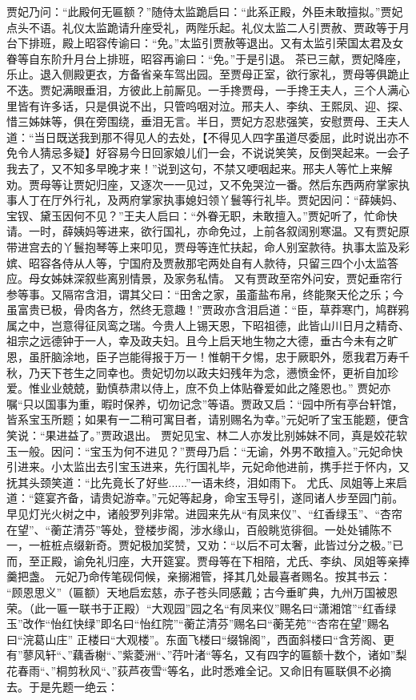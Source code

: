 \documentclass[12pt,oneside]{book}
\begin{document}
贾妃乃问：“此殿何无匾额？”随侍太监跪启曰：“此系正殿，外臣未敢擅拟。”贾妃点头不语。礼仪太监跪请升座受礼，两陛乐起。礼仪太监二人引贾赦、贾政等于月台下排班，殿上昭容传谕曰：“免。”太监引贾赦等退出。又有太监引荣国太君及女眷等自东阶升月台上排班，昭容再谕曰：“免。”于是引退。
茶已三献，贾妃降座，乐止。退入侧殿更衣，方备省亲车驾出园。至贾母正室，欲行家礼，贾母等俱跪止不迭。贾妃满眼垂泪，方彼此上前厮见。一手搀贾母，一手搀王夫人，三个人满心里皆有许多话，只是俱说不出，只管呜咽对泣。邢夫人、李纨、王熙凤、迎、探、惜三姊妹等，俱在旁围绕，垂泪无言。半日，贾妃方忍悲强笑，安慰贾母、王夫人道：“当日既送我到那不得见人的去处，【不得见人四字虽道尽委屈，此时说出亦不免令人猜忌多疑】好容易今日回家娘儿们一会，不说说笑笑，反倒哭起来。一会子我去了，又不知多早晚才来！”说到这句，不禁又哽咽起来。邢夫人等忙上来解劝。贾母等让贾妃归座，又逐次一一见过，又不免哭泣一番。然后东西两府掌家执事人丁在厅外行礼，及两府掌家执事媳妇领丫鬟等行礼毕。贾妃因问：“薛姨妈、宝钗、黛玉因何不见？”王夫人启曰：“外眷无职，未敢擅入。”贾妃听了，忙命快请。一时，薛姨妈等进来，欲行国礼，亦命免过，上前各叙阔别寒温。又有贾妃原带进宫去的丫鬟抱琴等上来叩见，贾母等连忙扶起，命人别室款待。执事太监及彩嫔、昭容各侍从人等，宁国府及贾赦那宅两处自有人款待，只留三四个小太监答应。母女姊妹深叙些离别情景，及家务私情。
又有贾政至帘外问安，贾妃垂帘行参等事。又隔帘含泪，谓其父曰：“田舍之家，虽齑盐布帛，终能聚天伦之乐；今虽富贵已极，骨肉各方，然终无意趣！”贾政亦含泪启道：“臣，草莽寒门，鸠群鸦属之中，岂意得征凤鸾之瑞。今贵人上锡天恩，下昭祖德，此皆山川日月之精奇、祖宗之远德钟于一人，幸及政夫妇。且今上启天地生物之大德，垂古今未有之旷恩，虽肝脑涂地，臣子岂能得报于万一！惟朝干夕惕，忠于厥职外，愿我君万寿千秋，乃天下苍生之同幸也。贵妃切勿以政夫妇残年为念，懑愤金怀，更祈自加珍爱。惟业业兢兢，勤慎恭肃以侍上，庶不负上体贴眷爱如此之隆恩也。”
贾妃亦嘱“只以国事为重，暇时保养，切勿记念”等语。贾政又启：“园中所有亭台轩馆，皆系宝玉所题；如果有一二稍可寓目者，请别赐名为幸。”元妃听了宝玉能题，便含笑说：“果进益了。”贾政退出。
贾妃见宝、林二人亦发比别姊妹不同，真是姣花软玉一般。因问：“宝玉为何不进见？”贾母乃启：“无谕，外男不敢擅入。”元妃命快引进来。小太监出去引宝玉进来，先行国礼毕，元妃命他进前，携手拦于怀内，又抚其头颈笑道：“比先竟长了好些......”一语未终，泪如雨下。
尤氏、凤姐等上来启道：“筵宴齐备，请贵妃游幸。”元妃等起身，命宝玉导引，遂同诸人步至园门前。早见灯光火树之中，诸般罗列非常。进园来先从“有凤来仪”、“红香绿玉”、“杏帘在望”、“蘅芷清芬”等处，登楼步阁，涉水缘山，百般眺览徘徊。一处处铺陈不一，一桩桩点缀新奇。贾妃极加奖赞，又劝：“以后不可太奢，此皆过分之极。”已而，至正殿，谕免礼归座，大开筵宴。贾母等在下相陪，尤氏、李纨、凤姐等亲捧羹把盏。
元妃乃命传笔砚伺候，亲搦湘管，择其几处最喜者赐名。按其书云：
“顾恩思义”（匾额）天地启宏慈，赤子苍头同感戴；古今垂旷典，九州万国被恩荣。（此一匾一联书于正殿）“大观园”园之名“有凤来仪”赐名曰“潇湘馆”“红香绿玉”改作“怡红快绿”即名曰“怡红院”“蘅芷清芬”赐名曰“蘅芜苑”“杏帘在望”赐名曰“浣葛山庄”
正楼曰“大观楼”。东面飞楼曰“缀锦阁”，西面斜楼曰“含芳阁、更有”蓼风轩“、”藕香榭“、”紫菱洲“、”荇叶渚“等名，又有四字的匾额十数个，诸如”梨花春雨“、”桐剪秋风“、”荻芦夜雪“等名，此时悉难全记。又命旧有匾联俱不必摘去。于是先题一绝云：
\end{document}
